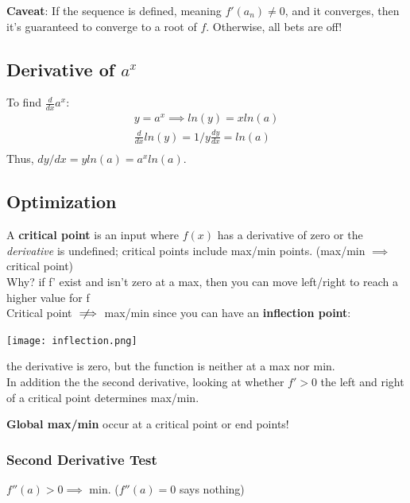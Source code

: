 \documentclass[a4paper, 12pt]{article}
\newcommand{\bt}[1]{\textbf{#1}} %
\newcommand{\eq}[1]{\begin{align*}#1\end{align*}} %
\newcommand{\notimplies}{%
  \mathrel{{\ooalign{\hidewidth$\not\phantom{=}$\hidewidth\cr$\implies$}}}}
\renewcommand{\eq}[1]{\begin{align*}#1\end{align*}} %
\newcommand{\gray}[1]{\textcolor[gray]{0.5}{#1}} %
\begin{document}
\bt{Caveat}: If the sequence is defined, meaning $f'(a_n) \neq 0$, and it converges, then it's guaranteed to converge to a root of $f$. Otherwise, all bets are off!


\subsection*{Derivative of $a^x$}

To find $\frac{d}{dx} a^x$: 
\eq{
y = a^x \implies ln(y) = x ln(a) \\
\frac{d}{dx} ln(y) = 1/y \frac{dy}{dx} = ln(a) \\
}
Thus, $dy/dx = y ln(a) = a^x ln(a).$

\subsection{Optimization}

A \bt{critical point} is an input where $f(x)$ has a derivative of zero or the \textit{derivative} is undefined; critical points include max/min points.
(max/min $\implies$ critical point)\\
\gray{Why? if f' exist and isn't zero at a max, then you can move left/right to reach a higher value for f}\\
Critical point $\notimplies$ max/min since you can have an \bt{inflection point}: 

\texttt{[image: inflection.png]}

the derivative is zero, but the function is neither at a max nor min.\\

In addition the the second derivative, looking at whether $f' > 0$ the left and right of a critical point determines max/min.

\bt{Global max/min} occur at a critical point or end points!

\subsubsection{Second Derivative Test}
$f''(a) > 0 \implies$ min. ($f''(a) =0$ says nothing)
\end{document}
